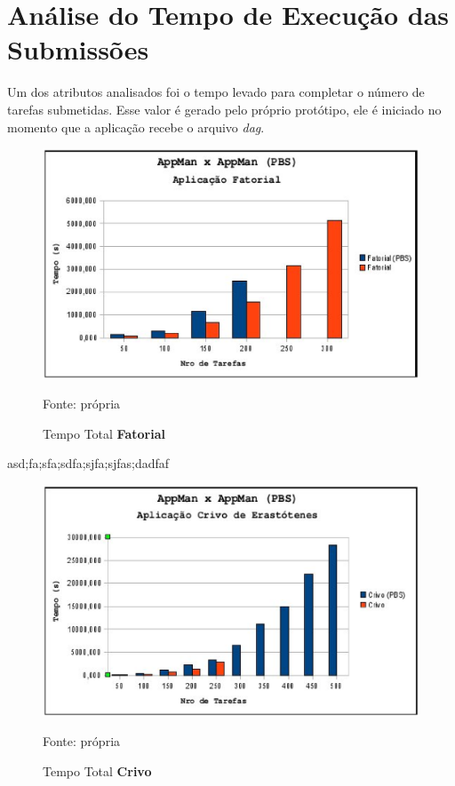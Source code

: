 \section{Análise do Tempo de Execução das Submissões}

Um dos atributos analisados foi o tempo levado para completar o número de tarefas submetidas. Esse valor é gerado pelo próprio protótipo, ele é iniciado no momento que a aplicação recebe o arquivo \emph{dag}. 

\begin{figure}[htb]
\begin{center}
\includegraphics[scale=0.8]{./img/MapaFatorialTempoTotal.ps}
\caption{Tempo Total \textbf{Fatorial}}
\label{fig:fatorial_total}
Fonte: própria
\end{center}
\end{figure}


asd;fa;sfa;sdfa;sjfa;sjfas;dadfaf

\begin{figure}[htb]
\begin{center}
\includegraphics[scale=0.8]{./img/MapaCrivoTempoTotal.ps}
\caption{Tempo Total \textbf{Crivo}}
\label{fig:crivo_total}
Fonte: própria
\end{center}
\end{figure}
	
